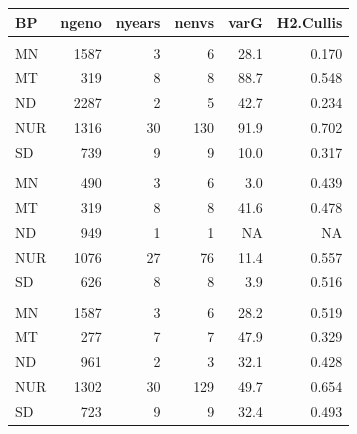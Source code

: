 \begin{table}[t]
\fontsize{12.0pt}{14.0pt}\selectfont
\begin{tabular*}{\linewidth}{@{\extracolsep{\fill}}lrrrrr}
\toprule
BP & ngeno & nyears & nenvs & varG & H2.Cullis \\ 
\midrule\addlinespace[2.5pt]
\multicolumn{6}{l}{DIS} \\[2.5pt] 
\midrule\addlinespace[2.5pt]
MN & 1587 & 3 & 6 & 28.1 & 0.170 \\ 
MT & 319 & 8 & 8 & 88.7 & 0.548 \\ 
ND & 2287 & 2 & 5 & 42.7 & 0.234 \\ 
NUR & 1316 & 30 & 130 & 91.9 & 0.702 \\ 
SD & 739 & 9 & 9 & 10.0 & 0.317 \\ 
\midrule\addlinespace[2.5pt]
\multicolumn{6}{l}{DON} \\[2.5pt] 
\midrule\addlinespace[2.5pt]
MN & 490 & 3 & 6 & 3.0 & 0.439 \\ 
MT & 319 & 8 & 8 & 41.6 & 0.478 \\ 
ND & 949 & 1 & 1 & NA & NA \\ 
NUR & 1076 & 27 & 76 & 11.4 & 0.557 \\ 
SD & 626 & 8 & 8 & 3.9 & 0.516 \\ 
\midrule\addlinespace[2.5pt]
\multicolumn{6}{l}{VSK} \\[2.5pt] 
\midrule\addlinespace[2.5pt]
MN & 1587 & 3 & 6 & 28.2 & 0.519 \\ 
MT & 277 & 7 & 7 & 47.9 & 0.329 \\ 
ND & 961 & 2 & 3 & 32.1 & 0.428 \\ 
NUR & 1302 & 30 & 129 & 49.7 & 0.654 \\ 
SD & 723 & 9 & 9 & 32.4 & 0.493 \\ 
\bottomrule
\end{tabular*}
\end{table}

